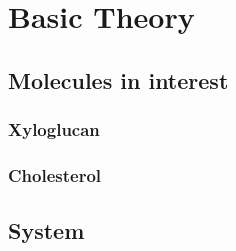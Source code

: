 
\chapter{Basic Theory}




\section{Molecules in interest}
\subsection{Xyloglucan}

\subsection{Cholesterol}

\section{System }

\cleardoublepage